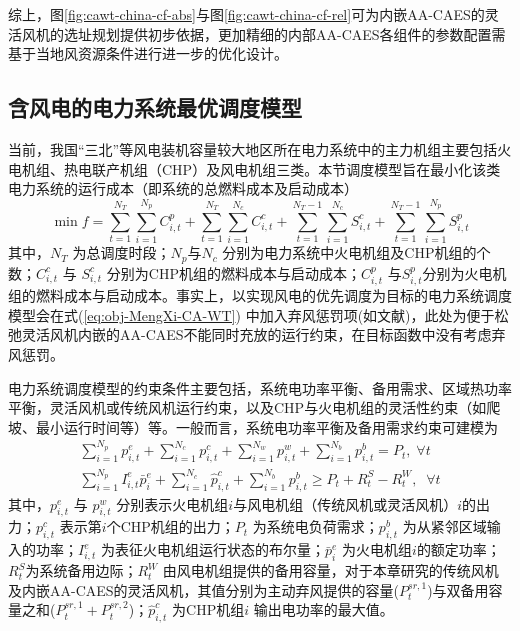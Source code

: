 综上，图\ref{fig:cawt-china-cf-abs}与图\ref{fig:cawt-china-cf-rel}可为内嵌AA-CAES的灵活风机的选址规划提供初步依据，更加精细的内部AA-CAES各组件的参数配置需基于当地风资源条件进行进一步的优化设计。


\subsection{含风电的电力系统最优调度模型}
\label{sec:ca-wt-power-energy-pene}
当前，我国“三北”等风电装机容量较大地区所在电力系统中的主力机组主要包括火电机组、热电联产机组（CHP）及风电机组三类。本节调度模型旨在最小化该类电力系统的运行成本（即系统的总燃料成本及启动成本）
\begin{equation}
\label{eq:obj-MengXi-CA-WT}
\min f = \sum\limits_{t = 1}^{{N_T}} {\sum\limits_{i = 1}^{{N_p}} {C_{i,t}^p} }  + \sum\limits_{t = 1}^{{N_T}} {\sum\limits_{i = 1}^{{N_c}} {C_{i,t}^c} }  + \sum\limits_{t = 1}^{{N_T} - 1} {\sum\limits_{i = 1}^{{N_c}} {S_{i,t}^c} }  + \sum\limits_{t = 1}^{{N_T} - 1} {\sum\limits_{i = 1}^{{N_p}} {S_{i,t}^p} }
\end{equation}
其中，${N_T}$ 为总调度时段；${N_p}$与${N_c}$ 分别为电力系统中火电机组及CHP机组的个数；$C_{i,t}^c$ 与 $S_{i,t}^c$ 分别为CHP机组的燃料成本与启动成本；$C_{i,t}^p$ 与$S_{i,t}^p$分别为火电机组的燃料成本与启动成本。事实上，以实现风电的优先调度为目标的电力系统调度模型会在式(\ref{eq:obj-MengXi-CA-WT}) 中加入弃风惩罚项(如文献)，此处为便于松弛灵活风机内嵌的AA-CAES不能同时充放的运行约束，在目标函数中没有考虑弃风惩罚。

电力系统调度模型的约束条件主要包括，系统电功率平衡、备用需求、区域热功率平衡，灵活风机或传统风机运行约束，以及CHP与火电机组的灵活性约束（如爬坡、最小运行时间等）等。一般而言，系统电功率平衡及备用需求约束可建模为\cite{IES-Model-CXY-18}
\begin{subequations}
\begin{gather}
\sum\limits_{i = 1}^{{N_p}} {p_{i,t}^e}  + \sum\limits_{i = 1}^{{N_c}} {p_{i,t}^c}  + \sum\limits_{i = 1}^{{N_w}} {p_{i,t}^w}  + \sum\limits_{i = 1}^{{N_b}} {p_{i,t}^b}  = {P_t}, \;\forall t\\
\sum\limits_{i = 1}^{{N_p}} {I_{i,t}^e\bar p_i^e}  + \sum\limits_{i = 1}^{{N_c}} {\hat p_{i,t}^c}  + \sum\limits_{i = 1}^{{N_b}} {p_{i,t}^b}  \ge {P_t} + R_t^S - R_t^W,\;\;\forall t
\end{gather}
\end{subequations}
其中，$p_{i,t}^e$ 与 $p_{i,t}^w$ 分别表示火电机组$i$与风电机组（传统风机或灵活风机）$i$的出力；$p_{i,t}^c$ 表示第$i$个CHP机组的出力；$P_t$ 为系统电负荷需求；$p_{i,t}^b$ 为从紧邻区域输入的功率；$I_{i,t}^e$ 为表征火电机组运行状态的布尔量；$\bar p_i^e$ 为火电机组$i$的额定功率；$R_t^S$为系统备用边际；$R_t^W$ 由风电机组提供的备用容量，对于本章研究的传统风机及内嵌AA-CAES的灵活风机，其值分别为主动弃风提供的容量($P_t^{sr,1}$)与双备用容量之和($P_t^{sr,1} + P_t^{sr,2}$)；$\hat p_{i,t}^c$ 为CHP机组$i$ 输出电功率的最大值。%

